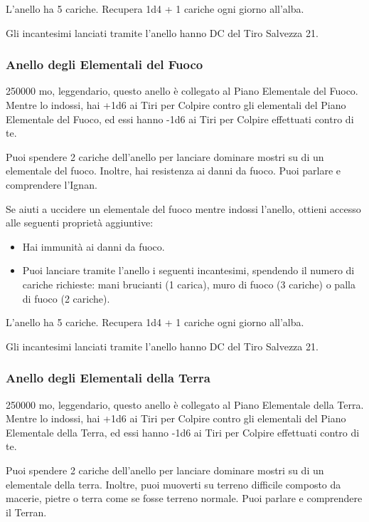 \begin{multicols}{2}
	L'anello ha 5 cariche. Recupera 1d4 + 1 cariche ogni giorno all'alba.

	Gli incantesimi lanciati tramite l'anello hanno DC del Tiro Salvezza 21.


	\subsubsection*{Anello degli Elementali del Fuoco}
	250000 mo, leggendario, questo anello è collegato al Piano Elementale del Fuoco. Mentre lo indossi, hai +1d6 ai Tiri per Colpire contro gli elementali del Piano Elementale del Fuoco, ed essi hanno -1d6 ai Tiri per Colpire effettuati contro di te.

	Puoi spendere 2 cariche dell'anello per lanciare dominare mostri su di un elementale del fuoco. Inoltre, hai resistenza ai danni da fuoco. Puoi parlare e comprendere l'Ignan.

	Se aiuti a uccidere un elementale del fuoco mentre indossi l'anello, ottieni accesso alle seguenti proprietà aggiuntive:

	\medskip

	\begin{itemize}
		\item
		Hai immunità ai danni da fuoco.
		\item
		Puoi lanciare tramite l'anello i seguenti incantesimi, spendendo il numero di cariche richieste: mani brucianti (1 carica), muro di fuoco (3 cariche) o palla di fuoco (2 cariche).
	\end{itemize}

	\medskip

	L'anello ha 5 cariche. Recupera 1d4 + 1 cariche ogni giorno all'alba.

	Gli incantesimi lanciati tramite l'anello hanno DC del Tiro Salvezza 21.

	\subsubsection*{Anello degli Elementali della Terra}
	250000 mo, leggendario, questo anello è collegato al Piano Elementale della Terra. Mentre lo indossi, hai +1d6 ai Tiri per Colpire contro gli elementali del Piano Elementale della Terra, ed essi hanno -1d6 ai Tiri per Colpire effettuati contro di te.

	Puoi spendere 2 cariche dell'anello per lanciare dominare mostri su di un elementale della terra. Inoltre, puoi muoverti su terreno difficile composto da macerie, pietre o terra come se fosse terreno normale. Puoi parlare e comprendere il Terran.


\end{multicols}
